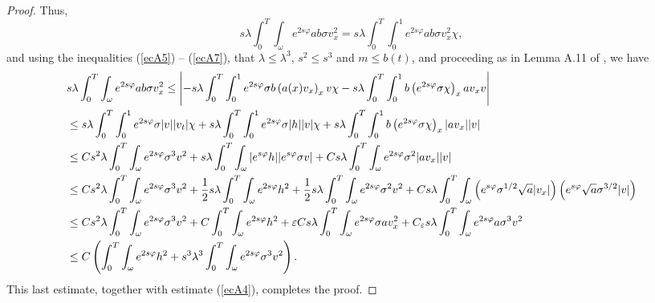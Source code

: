 \documentclass[11pt,oneside,a4papper]{osajnl}
\begin{document}
\begin{proof}
    Thus,
    $$s\lambda \int_0^T \int_\omega e^{2s\varphi} ab \sigma v_x^2 = s\lambda \int_0^T \int_0^{1} e^{2s\varphi} ab \sigma v_x^2\chi,$$
    and using the inequalities (\ref{ecA5}) -- (\ref{ecA7}), that $\lambda\leq \lambda^3$, $s^2\leq s^3$ and $m\leq b(t)$, and proceeding as in Lemma A.11 of \cite{DemarqueLimacoViana_deg_eq2018}, we have 
    \begin{align*}
        &s\lambda \int_0^T \int_\omega e^{2s\varphi} ab \sigma v_x^2	\leq  \left|  -s\lambda\int_0^T \int_0^{1}e^{2s\varphi}\sigma b\left(a(x)v_x\right)_x v\chi-s\lambda\int_0^T \int_0^{1} b\left(e^{2s\varphi}\sigma \chi \right)_x a v_x v  \right|\\
        &\hspace*{-0cm}\leq  s\lambda\int_0^T \int_0^{1} e^{2s\varphi}\sigma |v ||v_t| \chi +s \lambda  \int_0^T \int_0^{1}e^{2s\varphi} \sigma |h| |v| \chi  +s\lambda\int_0^T \int_0^{1} b\left(e^{2s\varphi}\sigma \chi \right)_x |a v_x|  |v|\\
        &\hspace*{-0cm}\leq Cs^2\lambda\int_0^T \int_\omega e^{2s\varphi}\sigma^3 v^2+s \lambda  \int_0^T \int_\omega  |e^{s\varphi} h| |e^{s\varphi}\sigma v| +Cs\lambda\int_0^T \int_\omega e^{2s\varphi} \sigma^2 |av_x| |v|\\
        &\leq Cs^2\lambda\int_0^T \int_\omega e^{2s\varphi}\sigma^3 v^2+\frac{1}{2}s \lambda  \int_0^T \int_\omega  e^{2s\varphi} h^2 +\frac{1}{2}s \lambda  \int_0^T \int_\omega  e^{2s\varphi}\sigma^2 v^2
        +Cs \lambda \int_0^T \int_\omega\left( e^{s\varphi}\sigma^{1/2}\sqrt{a}|v_x| \right)\left( e^{s\varphi}\sqrt{a}\sigma^{3/2}|v|  \right)\\
        &\leq Cs^2\lambda\int_0^T \int_\omega e^{2s\varphi}\sigma^3 v^2+C  \int_0^T \int_\omega   e^{2s\varphi} h^2 +\varepsilon Cs\lambda \int_0^T \int_\omega e^{2s\varphi} \sigma a v_x^2 + C_\varepsilon s\lambda\int_0^T \int_\omega e^{2s\varphi} a\sigma^3v^2 \\
        &\leq C\left( \int_0^T \int_\omega   e^{2s\varphi} h^2+  s^3\lambda^3\int_0^T \int_\omega e^{2s\varphi}\sigma^3 v^2 \right).    
    \end{align*}  
	This last estimate, together with estimate (\ref{ecA4}), completes the proof.	
\end{proof}
\end{document}
